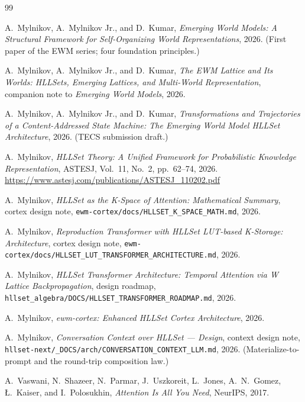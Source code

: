\documentclass[11pt,a4paper]{article}
\theoremstyle{remark}
\begin{document}
\begin{thebibliography}{99}

 A.~Mylnikov, A.~Mylnikov Jr., and D.~Kumar,
\textit{Emerging World Models: A Structural Framework for Self-Organizing World
Representations}, 2026. (First paper of the EWM series; four foundation
principles.)

 A.~Mylnikov, A.~Mylnikov Jr., and D.~Kumar,
\textit{The EWM Lattice and Its Worlds: HLLSets, Emerging Lattices, and
Multi-World Representation}, companion note to \textit{Emerging World Models},
2026.

 A.~Mylnikov, A.~Mylnikov Jr., and D.~Kumar,
\textit{Transformations and Trajectories of a Content-Addressed State Machine:
The Emerging World Model HLLSet Architecture}, 2026. (TECS submission draft.)

 A.~Mylnikov,
\textit{HLLSet Theory: A Unified Framework for Probabilistic Knowledge
Representation}, ASTESJ, Vol.~11, No.~2, pp.~62--74, 2026.
\url{https://www.astesj.com/publications/ASTESJ_110202.pdf}

 A.~Mylnikov,
\textit{HLLSet as the K-Space of Attention: Mathematical Summary}, cortex
design note, \texttt{ewm-cortex/docs/HLLSET\_K\_SPACE\_MATH.md}, 2026.

 A.~Mylnikov,
\textit{Reproduction Transformer with HLLSet LUT-based K-Storage:
Architecture}, cortex design note,
\texttt{ewm-cortex/docs/HLLSET\_LUT\_TRANSFORMER\_ARCHITECTURE.md}, 2026.

 A.~Mylnikov,
\textit{HLLSet Transformer Architecture: Temporal Attention via W Lattice
Backpropagation}, design roadmap,
\texttt{hllset\_algebra/DOCS/HLLSET\_TRANSFORMER\_ROADMAP.md}, 2026.

 A.~Mylnikov,
\textit{ewm-cortex: Enhanced HLLSet Cortex Architecture}, 2026.

 A.~Mylnikov,
\textit{Conversation Context over HLLSet --- Design}, context design note,
\texttt{hllset-next/\_DOCS/arch/CONVERSATION\_CONTEXT\_LLM.md}, 2026.
(Materialize-to-prompt and the round-trip composition law.)

 A.~Vaswani, N.~Shazeer, N.~Parmar, J.~Uszkoreit,
L.~Jones, A.~N.~Gomez, \L.~Kaiser, and I.~Polosukhin,
\textit{Attention Is All You Need}, NeurIPS, 2017.


\end{thebibliography}
\end{document}
